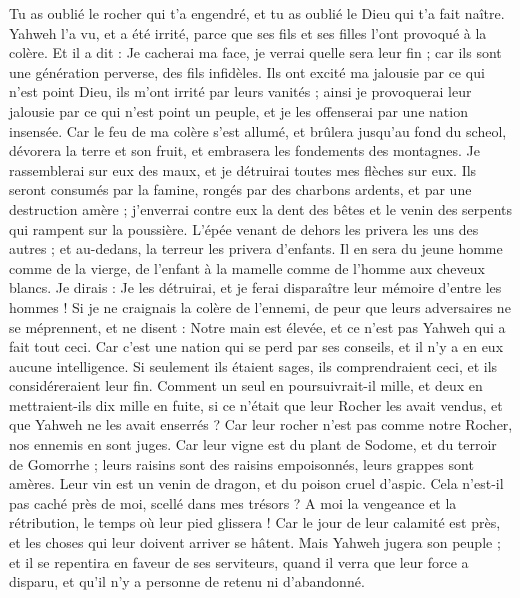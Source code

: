 \begin{multicols}{2}
Tu as oublié le rocher qui t'a engendré, et tu as oublié le Dieu qui t'a fait naître.
Yahweh l'a vu, et a été irrité, parce que ses fils et ses filles l'ont provoqué à la colère.
Et il a dit : Je cacherai ma face, je verrai quelle sera leur fin ; car ils sont une génération perverse, des fils infidèles.
Ils ont excité ma jalousie par ce qui n'est point Dieu, ils m’ont irrité par leurs vanités ; ainsi je provoquerai leur jalousie par ce qui n'est point un peuple, et je les offenserai par une nation insensée.
Car le feu de ma colère s'est allumé, et brûlera jusqu'au fond du scheol, dévorera la terre et son fruit, et embrasera les fondements des montagnes.
Je rassemblerai sur eux des maux, et je détruirai toutes mes flèches sur eux.
Ils seront consumés par la famine, rongés par des charbons ardents, et par une destruction amère ; j'enverrai contre eux la dent des bêtes et le venin des serpents qui rampent sur la poussière.
L’épée venant de dehors les privera les uns des autres ; et au-dedans, la terreur les privera d’enfants. Il en sera du jeune homme comme de la vierge, de l'enfant à la mamelle comme de l'homme aux cheveux blancs.
Je dirais : Je les détruirai, et je ferai disparaître leur mémoire d'entre les hommes !
Si je ne craignais la colère de l’ennemi, de peur que leurs adversaires ne se méprennent, et ne disent : Notre main est élevée, et ce n’est pas Yahweh qui a fait tout ceci.
Car c’est une nation qui se perd par ses conseils, et il n'y a en eux aucune intelligence.
Si seulement ils étaient sages, ils comprendraient ceci, et ils considéreraient leur fin.
Comment un seul en poursuivrait-il mille, et deux en mettraient-ils dix mille en fuite, si ce n'était que leur Rocher les avait vendus, et que Yahweh ne les avait enserrés ?
Car leur rocher n'est pas comme notre Rocher, nos ennemis en sont juges.
Car leur vigne est du plant de Sodome, et du terroir de Gomorrhe ; leurs raisins sont des raisins empoisonnés, leurs grappes sont amères.
Leur vin est un venin de dragon, et du poison cruel d'aspic.
Cela n'est-il pas caché près de moi, scellé dans mes trésors ?
A moi la vengeance et la rétribution, le temps où leur pied glissera ! Car le jour de leur calamité est près, et les choses qui leur doivent arriver se hâtent.
Mais Yahweh jugera son peuple ; et il se repentira en faveur de ses serviteurs, quand il verra que leur force a disparu, et qu'il n'y a personne de retenu ni d’abandonné.

\end{multicols}

